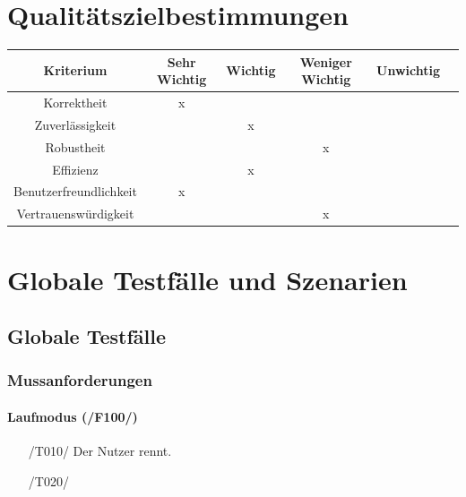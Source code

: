 \documentclass[a4paper,12pt]{article}
\begin{document}
\section{Qualitätszielbestimmungen}
\begin{tabular}[t]{|c|c|c|c|c|c|}
  \hline
  \textbf{Kriterium} & \textbf{Sehr Wichtig} & \textbf{Wichtig} & \textbf{Weniger Wichtig} & \textbf{Unwichtig}\\
  \hline
  \hline
  Korrektheit & x & & &\\ %
  \hline
  Zuverlässigkeit & & x & &\\ %
  \hline
  Robustheit & & & x &\\  %
  \hline
  Effizienz & & x & &\\ %
  \hline
  Benutzerfreundlichkeit & x & & &\\ %
  \hline
  Vertrauenswürdigkeit & & & x &\\ %
  \hline

\end{tabular}

\section{Globale Testfälle und Szenarien}
  \subsection{Globale Testfälle}
    \subsubsection{Mussanforderungen}
    \paragraph{Laufmodus (/F100/)}
    \begin{enumerate}
      \item[/T010/] Der Nutzer rennt.
      \item[/T020/]
    \end{enumerate}
\end{document}
